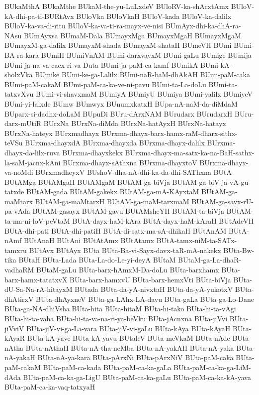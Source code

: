{BUkaMthA
BUkaMthe
BUkaM-the-yu-LuLxdeV
BUloRV-ka-shAcxtAmx
BUloV-kA-dhi-pa-ti-BURtAvx
BUloVka
BUloVkaH
BUloV-kada
BUloV-ka-dalilx
BUloV-ka-va-di-ritu
BUloV-ka-va-ti-ra-mayx-ve-nisi
BUmAyx-dhi-ka-dhA-ra-NAsu
BUmAyxsa
BUmaM-Dala
BUmayxMga
BUmayxMgaH
BUmayxMgaM
BUmayxM-ga-dalilx
BUmayxM-shada
BUmayxM-shataH
BUmeVH
BUmi
BUmi-BA-ra-kara
BUmiH
BUmiVnAM
BUmi-darxvayxM
BUmi-gaLu
BUmige
BUmija
BUmi-ja-na-va-cacx-ri-va-Duta
BUmi-ja-paM-ca-kamf
BUmikA
BUmi-kA-sholxVka
BUmike
BUmi-ke-ga-Lalilx
BUmi-naR-baM-dhAkAH
BUmi-paM-caka
BUmi-paM-cakaM
BUmi-paM-ca-ka-ve-ni-pavu
BUmi-ta-La-doLu
BUmi-ta-tatxvXvu
BUmi-vi-shavxmaM
BUmiyA
BUmiyU
BUmiya
BUmi-yalilx
BUmiyeV
BUmi-yi-lalxde
BUmw
BUmwyx
BUnumxkatxH
BUpa-nA-naM-da-diMdaM
BUparx-si-dadhx-doLaM
BUpuDi
BUru-dArxNAM
BUrudarx
BUrudarxH
BUru-darx-mUtiR
BUrxNa
BUrxNa-diMda
BUrxNa-hatAyxH
BUrxNa-hatayx
BUrxNa-hateyx
BUrxmadhayx
BUrxma-dhayx-barx-hamx-raM-dharx-sithx-teVSu
BUrxma-dhayxdA
BUrxma-dhayxda
BUrxma-dhayx-dalilx
BUrxma-dhayx-da-lilx-ruva
BUrxma-dhayxkekx
BUrxma-dhayx-ma-satx-ka-na-BaH-sathx-la-saM-jacnx-kAni
BUrxma-dhayx-sAthxna
BUrxma-dhayxtoV
BUrxma-dhayx-va-noMdi
BUrxmadheyxV
BUshoV-dha-nA-dhi-ka-da-dhi-SAThxna
BUtA
BUtAMga
BUtAMgaH
BUtAMgaM
BUtAM-ga-biVja
BUtAM-ga-biV-ja-vA-gu-tatxde
BUtAM-gada
BUtAM-gakekx
BUtAM-ga-mA-KAyxtaM
BUtAM-ga-maMtarx
BUtAM-ga-maMtarxH
BUtAM-ga-maM-tarxmaM
BUtAM-ga-savx-rU-pa-vAda
BUtAM-gasayx
BUtAM-gavu
BUtAMsheYH
BUtAM-ta-biVja
BUtAM-ta-ma-ni-loV-peVtaM
BUtA-dayx-haM-kAra
BUtA-dayx-haM-kAraH
BUtAdeVH
BUtA-dhi-pati
BUtA-dhi-patiH
BUtA-di-satx-ma-sA-dhikaH
BUtAnAM
BUtA-nAmf
BUtAnaH
BUtAni
BUtAtAmx
BUtAtamx
BUtA-tamx-niM-ta-SATx-tamxru
BUtAvx
BUtAyx
BUta
BUta-Ba-vi-Sayx-davx-taR-mA-nakekx
BUta-Bw-tika
BUtaH
BUta-Lada
BUta-La-do-Le-yi-deyA
BUtaM
BUtaM-ga-La-dhaR-vadhaRM
BUtaM-gaLu
BUta-barx-hAmxM-Da-doLu
BUta-barxhamx
BUta-barx-hamx-tatatxvX
BUta-barx-hamxvU
BUta-barx-hemxVti
BUta-biVja
BUta-dU-Sa-Na-rA-hitayxM
BUtada
BUta-da-yA-nivxtaH
BUta-da-yA-yukotxV
BUta-dhAtirxV
BUta-dhAyxneV
BUta-ga-LAhx-LA-davu
BUta-gaLa
BUta-ga-Lo-Dane
BUta-ga-NA-dhiVsha
BUta-hita
BUta-hitaM
BUta-hi-tako
BUta-hi-ta-vAgi
BUta-hi-ta-vaha
BUta-hi-ta-va-na-ri-ya-beVku
BUta-jAcnxna
BUta-jiVvi
BUta-jiVviV
BUta-jiV-vi-ga-La-vara
BUta-jiV-vi-gaLu
BUta-kAya
BUta-kAyaH
BUta-kAyaR
BUta-kA-yave
BUta-kA-yavu
BUtaleV
BUta-meVkaM
BUta-nAde
BUta-nAtha
BUta-nAthaH
BUta-nA-tha-neMba
BUta-nA-yakAH
BUta-nA-yaka
BUta-nA-yakaH
BUta-nA-ya-kara
BUta-pArxNi
BUta-pArxNiV
BUta-paM-caka
BUta-paM-cakaM
BUta-paM-ca-kada
BUta-paM-ca-ka-gaLa
BUta-paM-ca-ka-ga-LiM-dAda
BUta-paM-ca-ka-ga-LigU
BUta-paM-ca-ka-gaLu
BUta-paM-ca-ka-kA-yava
BUta-paM-ca-ka-vaq-tatxyaH
}
